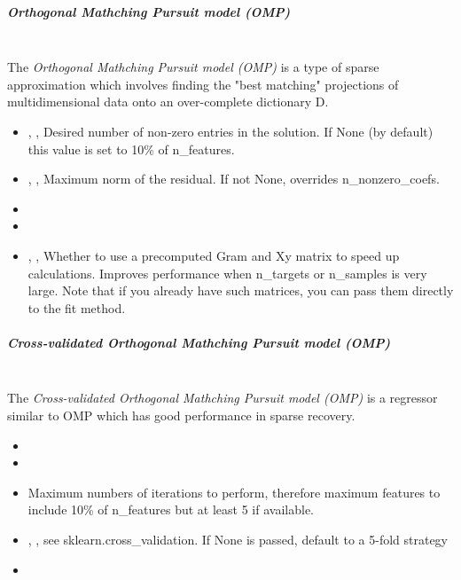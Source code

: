 \subparagraph{Orthogonal Mathching Pursuit model (OMP)}
\mbox{}
\\The \textit{Orthogonal Mathching Pursuit model (OMP)} is a type of sparse
approximation which involves finding the "best matching" projections of
multidimensional data onto an over-complete dictionary D.
%
\begin{itemize}
  \item {} , ,
  Desired number of non-zero entries in the solution.
  If None (by default) this value is set to 10\% of n\_features.
  \item {} , ,
  Maximum norm of the residual.
  If not None, overrides n\_nonzero\_coefs.
  \item {}
  \item {}
  \item {} , ,
  Whether to use a precomputed Gram and Xy matrix to speed up calculations.
  Improves performance when n\_targets or n\_samples is very large.
  Note that if you already have such matrices, you can pass them directly to the
  fit method.
\end{itemize}

\subparagraph{Cross-validated Orthogonal Mathching Pursuit model (OMP)}
\mbox{}
\\The \textit{Cross-validated Orthogonal Mathching Pursuit model (OMP)} is a
regressor similar to OMP which has good performance in sparse recovery.
%
\begin{itemize}
  \item {}
  \item {}
  \item \maxIterDescription{}
  Maximum numbers of iterations to perform, therefore maximum features to
  include 10\% of n\_features but at least 5 if available.
  \item {} , ,
  see sklearn.cross\_validation.
  If None is passed, default to a 5-fold strategy
  \item \verDescriptionB
\end{itemize}

